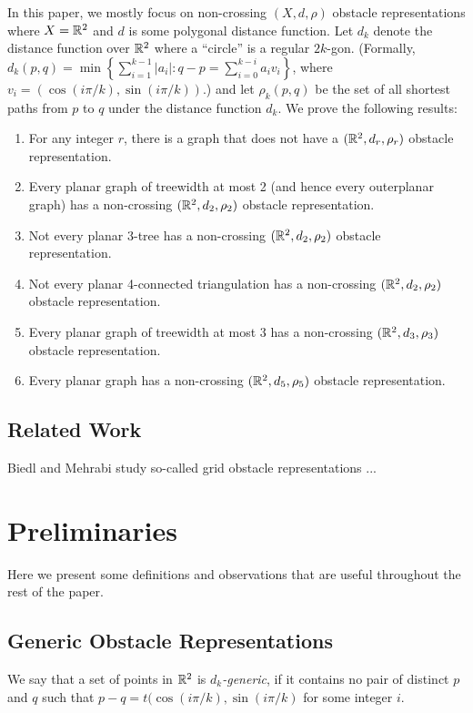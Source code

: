\documentclass{patmorin}
\begin{document}
In this paper, we mostly focus on non-crossing $(X,d,\rho)$
obstacle representations where $X=\mathbb{R}^2$ and $d$ is some
polygonal distance function.  Let $d_k$ denote the distance
function over $\mathbb{R}^2$ where a ``circle'' is a regular $2k$-gon.
(Formally, $d_k(p,q)=\min\left\{\sum_{i=1}^{k-1}|a_i|:
q-p=\sum_{i=0}^{k-i}a_iv_i\right\}$, where $v_i=(\cos(i\pi/k),
\sin(i\pi/k))$.)  and let $\rho_k(p,q)$ be the set of all shortest
paths from $p$ to $q$ under the distance function $d_k$.  We prove the
following results:
\begin{enumerate}
   \item For any integer $r$, there is a graph that does not have a
     $(\mathbb{R}^2,d_r,\rho_r)$ obstacle representation.
   \item Every planar graph of treewidth at most 2 (and hence every
     outerplanar graph) has a
     non-crossing $(\mathbb{R}^2,d_2,\rho_2)$ obstacle representation. 
   \item Not every planar 3-tree has a 
     non-crossing $(\mathbb{R}^2,d_2,\rho_2)$ obstacle representation.
   \item Not every planar 4-connected triangulation has a 
     non-crossing $(\mathbb{R}^2,d_2,\rho_2)$ obstacle representation.
   \item Every planar graph of treewidth at most 3 has a 
     non-crossing $(\mathbb{R}^2,d_3,\rho_3)$ obstacle representation.
   \item Every planar graph has a non-crossing
     $(\mathbb{R}^2,d_{5},\rho_{5})$ obstacle representation.
\end{enumerate}

\subsection{Related Work}

Biedl and Mehrabi study so-called grid obstacle representations \cite{X}...

\section{Preliminaries}

Here we present some definitions and observations that are useful
throughout the rest of the paper.  

\subsection{Generic Obstacle Representations}

We say that a set of points in $\mathbb{R}^2$ is \emph{$d_k$-generic},
if it contains no pair of distinct $p$ and $q$ such that $p-q=
t(\cos(i\pi/k),\sin(i\pi/k)$ for some integer $i$.
\end{document}
